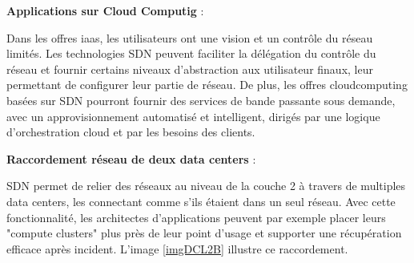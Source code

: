 \textbf{Applications sur Cloud Computig} : 

Dans les offres \gls{iaas}, les utilisateurs ont une vision et un contrôle du réseau  limités. Les technologies SDN peuvent faciliter la délégation du contrôle du réseau et fournir certains niveaux d'abstraction aux utilisateur finaux, leur permettant de configurer leur partie de réseau. De plus, les offres \gls{cloudcomputing} basées sur SDN pourront fournir des services de bande passante sous demande, avec un approvisionnement automatisé et intelligent, dirigés par une logique d'orchestration cloud et par les besoins des clients. \cite{AdoptionResearchTrendsCloud}




\textbf{Raccordement réseau de deux data centers} : 

SDN permet de relier des réseaux au niveau de la couche 2 à travers de multiples data centers, les connectant comme s'ils étaient dans un seul réseau. Avec cette fonctionnalité, les architectes d'applications peuvent par exemple placer leurs "compute clusters" plus près de leur point d'usage et supporter une récupération efficace après incident. \cite{ODCAusageScenarios} L'image \ref{imgDCL2B} illustre ce raccordement.

